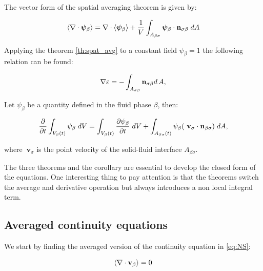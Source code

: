 \begin{corollary}
	The vector form of the spatial averaging theorem is given by:
	
	\begin{equation}
	{\left< \nabla \cdot \boldsymbol{\psi}_{\beta} \right>} = \nabla \cdot {\left<  \boldsymbol{\psi}_{\beta} \right>} + \dfrac{1}{V} \int_{A_{\beta \sigma}}  \boldsymbol{\psi}_{\beta} \cdot \mathbf{n}_{\sigma \beta} \;dA
			\label{th:vec_spat_avg}
	\end{equation}
\end{corollary}

\begin{corollary}
	Applying the theorem \eqref{th:spat_avg} to a constant field $\psi_{\beta} = 1$ the following relation can be found:
	
	\begin{equation}
		\nabla \varepsilon = - \int_{A_{\sigma \beta}} \mathbf{n}_{\sigma \beta} d \, A,
	\end{equation}
\end{corollary}

\newpage

\begin{theorem}
	Let $\psi_{\beta}$ be a quantity defined in the fluid phase $\beta$, then:
	
	\begin{equation}
	\dfrac{\partial}{\partial t} \int_{V_\beta(t)} \psi_{\beta} \; dV =  \int_{V_\beta(t)} \dfrac{\partial \psi_{\beta}}{\partial t} \; dV + \int_{A_{\beta \sigma}(t)} \psi_{\beta} ( \mathbf{\ v}_{\sigma} \cdot \mathbf{n}_{\beta \sigma} ) \;dA,
	\label{th:transport}
	\end{equation}
	
	where $\mathbf{\ v}_{\sigma}$ is the point velocity of the solid-fluid interface $A_{\beta \sigma}$.
\end{theorem}

The three theorems and the corollary are essential to develop the closed form of the equations.
One interesting thing to pay attention is that the theorems switch the average and derivative operation but always introduces a non local integral term.

\subsection{Averaged continuity equations}
We start by finding the averaged version of the continuity equation in \eqref{eq:NS}:

\begin{equation}
{\left< \nabla \cdot \textbf{v}_{\beta}\right>}   = 0
\label{eq:superf_avg_cont}
\end{equation}

